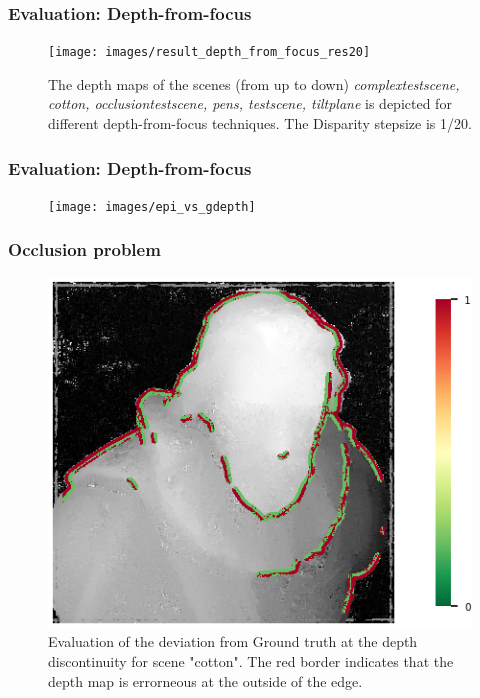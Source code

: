 \documentclass[11pt]{beamer}
\begin{document}
\begin{frame}
\frametitle{Evaluation: Depth-from-focus}
\begin{figure}
\centering
\texttt{[image: images/result\_depth\_from\_focus\_res20]}
\caption[Depth from focus: depthmaps]{The depth maps of the scenes (from up to down) \textit{complextestscene, cotton, occlusiontestscene, pens, testscene, tiltplane} is depicted for different depth-from-focus techniques. The Disparity stepsize is 1/20.}
\label{fig:resultdepthfromfocus}
\end{figure}
\end{frame}

\begin{frame}
\frametitle{Evaluation: Depth-from-focus}
\begin{figure}
\centering
\texttt{[image: images/epi\_vs\_gdepth]}

\end{figure}
\end{frame}



\begin{frame}
	\frametitle{Occlusion problem}
	\begin{figure}
		\centering
		\includegraphics[width=0.7\linewidth]{images/cotton_discontinuities_0070}
		\caption[Discontinuity evaluation]{Evaluation of the deviation from Ground truth at the depth discontinuity for scene "cotton". The red border indicates that the depth map is errorneous at the outside of the edge.}
		\label{fig:cottondiscontinuities0070}
	\end{figure}
\end{frame}
\end{document}
